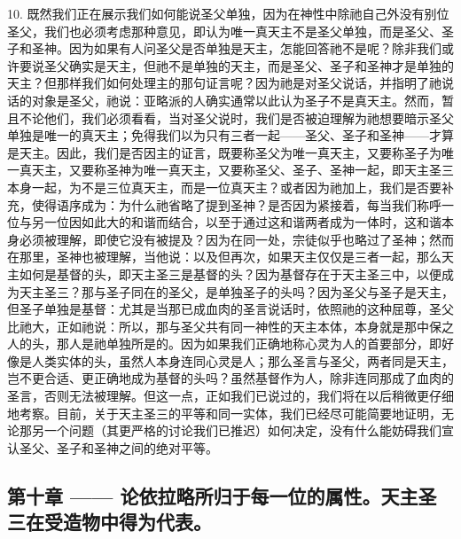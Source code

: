 10. 既然我们正在展示我们如何能说圣父单独，因为在神性中除祂自己外没有别位圣父，我们也必须考虑那种意见，即认为唯一真天主不是圣父单独，而是圣父、圣子和圣神。因为如果有人问圣父是否单独是天主，怎能回答祂不是呢？除非我们或许要说圣父确实是天主，但祂不是单独的天主，而是圣父、圣子和圣神才是单独的天主？但那样我们如何处理主的那句证言呢？因为祂是对圣父说话，并指明了祂说话的对象是圣父，祂说：亚略派的人确实通常以此认为圣子不是真天主。然而，暂且不论他们，我们必须看看，当对圣父说时，我们是否被迫理解为祂想要暗示圣父单独是唯一的真天主；免得我们以为只有三者一起——圣父、圣子和圣神——才算是天主。因此，我们是否因主的证言，既要称圣父为唯一真天主，又要称圣子为唯一真天主，又要称圣神为唯一真天主，又要称圣父、圣子、圣神一起，即天主圣三本身一起，为不是三位真天主，而是一位真天主？或者因为祂加上，我们是否要补充，使得语序成为：为什么祂省略了提到圣神？是否因为紧接着，每当我们称呼一位与另一位因如此大的和谐而结合，以至于通过这和谐两者成为一体时，这和谐本身必须被理解，即使它没有被提及？因为在同一处，宗徒似乎也略过了圣神；然而在那里，圣神也被理解，当他说：以及但再次，如果天主仅仅是三者一起，那么天主如何是基督的头，即天主圣三是基督的头？因为基督存在于天主圣三中，以便成为天主圣三？那与圣子同在的圣父，是单独圣子的头吗？因为圣父与圣子是天主，但圣子单独是基督：尤其是当那已成血肉的圣言说话时，依照祂的这种屈尊，圣父比祂大，正如祂说：所以，那与圣父共有同一神性的天主本体，本身就是那中保之人的头，那人是祂单独所是的。因为如果我们正确地称心灵为人的首要部分，即好像是人类实体的头，虽然人本身连同心灵是人；那么圣言与圣父，两者同是天主，岂不更合适、更正确地成为基督的头吗？虽然基督作为人，除非连同那成了血肉的圣言，否则无法被理解。但这一点，正如我们已说过的，我们将在以后稍微更仔细地考察。目前，关于天主圣三的平等和同一实体，我们已经尽可能简要地证明，无论那另一个问题（其更严格的讨论我们已推迟）如何决定，没有什么能妨碍我们宣认圣父、圣子和圣神之间的绝对平等。\par


\subsection{第十章 —— 论依拉略所归于每一位的属性。天主圣三在受造物中得为代表。}

